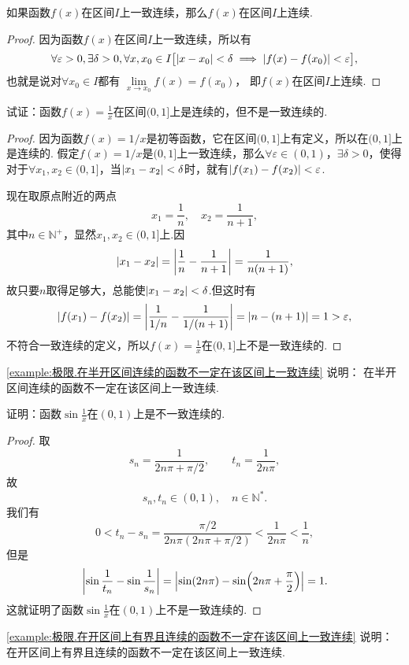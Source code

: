\begin{theorem}\label{theorem:极限.闭区间上连续函数的性质.一致连续函数一定连续}
如果函数\(f(x)\)在区间\(I\)上一致连续，那么\(f(x)\)在区间\(I\)上连续.
\begin{proof}
因为函数\(f(x)\)在区间\(I\)上一致连续，所以有
\[
\forall \varepsilon > 0,
\exists \delta > 0,
\forall x,x_0 \in I
\bigl[
	 \abs{x-x_0} < \delta
	 \implies
	 \abs{f(x)-f(x_0)} < \varepsilon
\bigr],
\]
也就是说对\(\forall x_0 \in I\)都有%
\(\lim\limits_{x \to x_0} f(x) = f(x_0)\)，
即\(f(x)\)在区间\(I\)上连续.
\end{proof}
\end{theorem}

\begin{example}\label{example:极限.在半开区间连续的函数不一定在该区间上一致连续}
试证：函数\(f(x) = \frac{1}{x}\)在区间\((0,1]\)上是连续的，但不是一致连续的.
\begin{proof}
因为函数\(f(x) = 1/x\)是初等函数，它在区间\((0,1]\)上有定义，所以在\((0,1]\)上是连续的.
假定\(f(x) = 1/x\)是\((0,1]\)上一致连续，那么\(\forall \varepsilon \in (0,1)\)，\(\exists \delta > 0\)，使得对于\(\forall x_1,x_2 \in (0,1]\)，当\(\abs{x_1 - x_2} < \delta\)时，就有\(\abs{f(x_1) - f(x_2)} < \varepsilon\).

现在取原点附近的两点\[
x_1 = \frac{1}{n}, \quad x_2 = \frac{1}{n+1},
\]其中\(n\in\mathbb{N}^+\)，显然\(x_1,x_2 \in (0,1]\)上.因\[
\abs{x_1 - x_2} = \abs{\frac{1}{n} - \frac{1}{n+1}}
= \frac{1}{n(n+1)},
\]故只要\(n\)取得足够大，总能使\(\abs{x_1 - x_2} < \delta\).但这时有\[
\abs{f(x_1) - f(x_2)}
= \abs{\frac{1}{1/n} - \frac{1}{1/(n+1)}}
= \abs{n - (n+1)}
= 1 > \varepsilon,
\]不符合一致连续的定义，所以\(f(x) = \frac{1}{x}\)在\((0,1]\)上不是一致连续的.
\end{proof}
\end{example}
\cref{example:极限.在半开区间连续的函数不一定在该区间上一致连续} 说明：
在半开区间连续的函数不一定在该区间上一致连续.

\begin{example}\label{example:极限.在开区间上有界且连续的函数不一定在该区间上一致连续}
证明：函数\(\sin\frac{1}{x}\)在\((0,1)\)上是不一致连续的.
\begin{proof}
取\[
s_n = \frac{1}{2n\pi+\pi/2},
\qquad
t_n = \frac{1}{2n\pi},
\]故\[
s_n,t_n\in(0,1),
\quad n\in\mathbb{N}^*.
\]我们有\[
0 < t_n - s_n = \frac{\pi/2}{2n\pi(2n\pi+\pi/2)} < \frac{1}{2n\pi} < \frac{1}{n},
\]但是\[
\abs{\sin\frac{1}{t_n} - \sin\frac{1}{s_n}}
= \abs{\sin(2n\pi) - \sin(2n\pi+\frac{\pi}{2})}
= 1.
\]这就证明了函数\(\sin\frac{1}{x}\)在\((0,1)\)上不是一致连续的.
\end{proof}
\end{example}
\cref{example:极限.在开区间上有界且连续的函数不一定在该区间上一致连续} 说明：
在开区间上有界且连续的函数不一定在该区间上一致连续.

